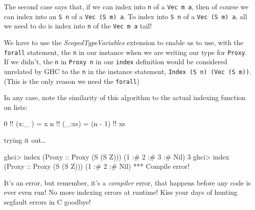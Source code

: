 \documentclass[]{article}
\newenvironment{Shaded}{}{}
\newcommand{\DataTypeTok}[1]{\textcolor[rgb]{0.56,0.13,0.00}{#1}}
\newcommand{\DecValTok}[1]{\textcolor[rgb]{0.25,0.63,0.44}{#1}}
\newcommand{\FunctionTok}[1]{\textcolor[rgb]{0.02,0.16,0.49}{#1}}
\newcommand{\NormalTok}[1]{#1}
\newcommand{\OperatorTok}[1]{\textcolor[rgb]{0.40,0.40,0.40}{#1}}
\newcommand{\OtherTok}[1]{\textcolor[rgb]{0.00,0.44,0.13}{#1}}
\begin{document}
The second case says that, if we can index into \texttt{n} of a
\texttt{Vec\ m\ a}, then of course we can index into an \texttt{S\ n} of a
\texttt{Vec\ (S\ m)\ a}. To index into \texttt{S\ n} of a
\texttt{Vec\ (S\ m)\ a}, all we need to do is index into \texttt{n} of the
\texttt{Vec\ m\ a} tail!

We have to use the \emph{ScopedTypeVariables} extension to enable us to use,
with the \texttt{forall} statement, the \texttt{n} in our instance when we are
writing our type for \texttt{Proxy}. If we didn't, the \texttt{n} in
\texttt{Proxy\ n} in our \texttt{index} definition would be considered unrelated
by GHC to the \texttt{n} in the instance statement,
\texttt{Index\ (S\ n)\ (Vec\ (S\ m))}. (This is the only reason we need the
\texttt{forall})

In any case, note the similarity of this algorithm to the actual indexing
function on lists:

\begin{Shaded}
\begin{Highlighting}[]
\DecValTok{0} \OperatorTok{!!}\NormalTok{ (x}\OperatorTok{:}\NormalTok{\_ ) }\OtherTok{=}\NormalTok{ x}
\NormalTok{n }\OperatorTok{!!}\NormalTok{ (\_}\OperatorTok{:}\NormalTok{xs) }\OtherTok{=}\NormalTok{ (n }\OperatorTok{{-}} \DecValTok{1}\NormalTok{) }\OperatorTok{!!}\NormalTok{ xs}
\end{Highlighting}
\end{Shaded}

trying it out\ldots{}

\begin{Shaded}
\begin{Highlighting}[]
\NormalTok{ghci}\OperatorTok{>} \FunctionTok{index}\NormalTok{ (}\DataTypeTok{Proxy}\OtherTok{ ::} \DataTypeTok{Proxy}\NormalTok{ (}\DataTypeTok{S}\NormalTok{ (}\DataTypeTok{S} \DataTypeTok{Z}\NormalTok{))) (}\DecValTok{1} \OperatorTok{:\#} \DecValTok{2} \OperatorTok{:\#} \DecValTok{3} \OperatorTok{:\#} \DataTypeTok{Nil}\NormalTok{)}
\DecValTok{3}
\NormalTok{ghci}\OperatorTok{>} \FunctionTok{index}\NormalTok{ (}\DataTypeTok{Proxy}\OtherTok{ ::} \DataTypeTok{Proxy}\NormalTok{ (}\DataTypeTok{S}\NormalTok{ (}\DataTypeTok{S} \DataTypeTok{Z}\NormalTok{))) (}\DecValTok{1} \OperatorTok{:\#} \DecValTok{2} \OperatorTok{:\#} \DataTypeTok{Nil}\NormalTok{)}
\OperatorTok{***} \DataTypeTok{Compile} \FunctionTok{error}\OperatorTok{!}
\end{Highlighting}
\end{Shaded}

It's an error, but remember, it's a \emph{compiler} error, that happens before
any code is ever even run! No more indexing errors at runtime! Kiss your days of
hunting segfault errors in C goodbye!
\end{document}
